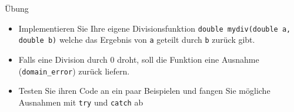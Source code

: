 \documentclass[presentation]{beamer}
\begin{document}
\begin{frame}[label={sec:org45d4965},fragile]{Übung}
 \begin{itemize}
\item Implementieren Sie Ihre \alert{eigene Divisionsfunktion} {\color{solarizedYellow}\texttt{double
  mydiv(double a, double b)} }welche das Ergebnis von {\color{solarizedYellow}\texttt{a} }geteilt durch
{\color{solarizedYellow}\texttt{b} }zurück gibt.
\item Falls eine Division durch 0 droht, soll die Funktion eine Ausnahme
({\color{solarizedYellow}\texttt{domain\_error}}) zurück liefern.
\item Testen Sie ihren Code an ein paar Beispielen und fangen Sie mögliche
Ausnahmen mit {\color{solarizedYellow}\texttt{try} }und {\color{solarizedYellow}\texttt{catch} }ab
\end{itemize}
\end{frame}
\end{document}
